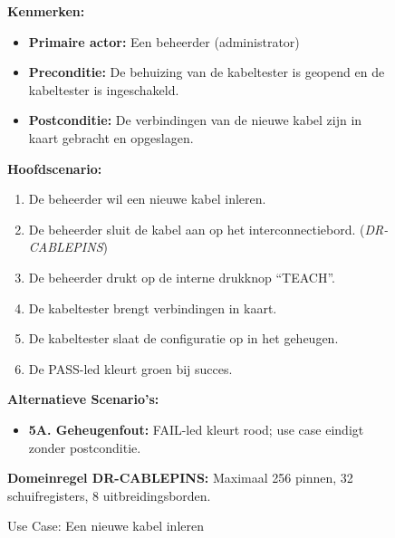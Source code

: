 \begin{figure}[!ht]
    \centering
    \captionsetup{width=0.8\textwidth}
    \begin{tcolorbox}[colback=white, colframe=odisee-navy, title=\textbf{Use Case: Een nieuwe kabel inleren}, width=\textwidth, sharp corners, label={uc:Teach}]
        \textbf{Kenmerken:}
        \begin{itemize}[noitemsep, label={}]
            \item \textbf{Primaire actor:} Een beheerder (administrator)
            \item \textbf{Preconditie:} De behuizing van de kabeltester is geopend en de kabeltester is ingeschakeld.
            \item \textbf{Postconditie:} De verbindingen van de nieuwe kabel zijn in kaart gebracht en opgeslagen.
        \end{itemize}
        
        \textbf{Hoofdscenario:}
        \begin{enumerate}[noitemsep]
            \item De beheerder wil een nieuwe kabel inleren.
            \item De beheerder sluit de kabel aan op het interconnectiebord. (\textit{DR-CABLEPINS})
            \item De beheerder drukt op de interne drukknop ``TEACH''.
            \item De kabeltester brengt verbindingen in kaart.
            \item De kabeltester slaat de configuratie op in het geheugen.
            \item De PASS-led kleurt groen bij succes.
        \end{enumerate}
        
        \textbf{Alternatieve Scenario's:}
        \begin{itemize}[noitemsep]
            \item \textbf{5A. Geheugenfout:} FAIL-led kleurt rood; use case eindigt zonder postconditie.
        \end{itemize}
        
        \tcblower 
        \textbf{Domeinregel DR-CABLEPINS:} Maximaal 256 pinnen, 32 schuifregisters, 8 uitbreidingsborden.
    \end{tcolorbox}
    \caption[Use Case Teach]{Use Case: Een nieuwe kabel inleren}
    \label{uc:Teach} 
\end{figure}

